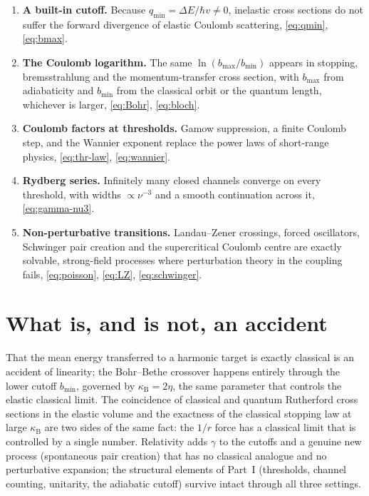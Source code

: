 \documentclass[11pt,a4paper]{book}
\numberwithin{equation}{chapter}
\newcommand{\kB}{\kappa_{\mathrm B}}
\begin{document}
\begin{enumerate}
  \item \textbf{A built-in cutoff.} Because $q_{\min}=\Delta E/\hbar v\neq0$,
        inelastic cross sections do not suffer the forward divergence of elastic
        Coulomb scattering, \eqref{eq:qmin}, \eqref{eq:bmax}.
  \item \textbf{The Coulomb logarithm.} The same $\ln(b_{\max}/b_{\min})$ appears
        in stopping, bremsstrahlung and the momentum-transfer cross section, with
        $b_{\max}$ from adiabaticity and $b_{\min}$ from the classical orbit or the
        quantum length, whichever is larger, \eqref{eq:Bohr}, \eqref{eq:bloch}.
  \item \textbf{Coulomb factors at thresholds.} Gamow suppression, a finite
        Coulomb step, and the Wannier exponent replace the power laws of
        short-range physics, \eqref{eq:thr-law}, \eqref{eq:wannier}.
  \item \textbf{Rydberg series.} Infinitely many closed channels converge on
        every threshold, with widths $\propto\nu^{-3}$ and a smooth continuation
        across it, \eqref{eq:gamma-nu3}.
  \item \textbf{Non-perturbative transitions.} Landau--Zener crossings, forced
        oscillators, Schwinger pair creation and the supercritical Coulomb centre
        are exactly solvable, strong-field processes where perturbation theory in
        the coupling fails, \eqref{eq:poisson}, \eqref{eq:LZ}, \eqref{eq:schwinger}.
\end{enumerate}

\section{What is, and is not, an accident}

That the mean energy transferred to a harmonic target is exactly classical is an
accident of linearity; the Bohr--Bethe crossover happens entirely through the
lower cutoff $b_{\min}$, governed by $\kB=2\eta$, the same parameter that
controls the elastic classical limit. The coincidence of classical and quantum
Rutherford cross sections in the elastic volume and the exactness of the
classical stopping law at large $\kB$ are two sides of the same fact: the $1/r$
force has a classical limit that is controlled by a single number. Relativity
adds $\gamma$ to the cutoffs and a genuine new process (spontaneous pair creation)
that has no classical analogue and no perturbative expansion; the structural
elements of Part~I (thresholds, channel counting, unitarity, the adiabatic cutoff)
survive intact through all three settings.
\end{document}
